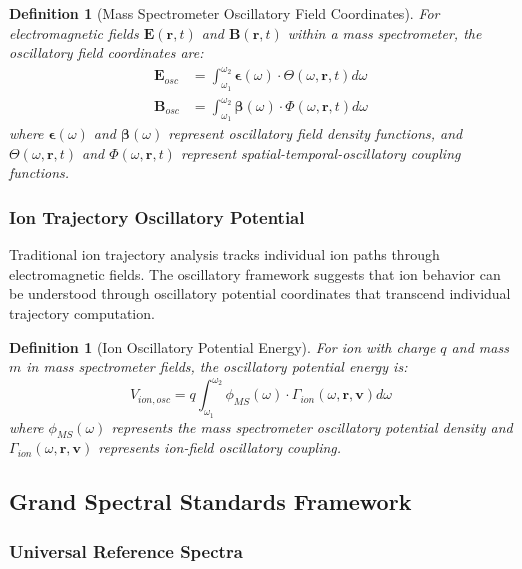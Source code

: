 \documentclass[11pt,a4paper]{article}
\newtheorem{definition}[theorem]{Definition}
\theoremstyle{remark}
\begin{document}
\begin{definition}[Mass Spectrometer Oscillatory Field Coordinates]
For electromagnetic fields $\mathbf{E}(\mathbf{r}, t)$ and $\mathbf{B}(\mathbf{r}, t)$ within a mass spectrometer, the oscillatory field coordinates are:
\begin{align}
\mathbf{E}_{osc} &= \int_{\omega_1}^{\omega_2} \boldsymbol{\epsilon}(\omega) \cdot \Theta(\omega, \mathbf{r}, t) d\omega\\
\mathbf{B}_{osc} &= \int_{\omega_1}^{\omega_2} \boldsymbol{\beta}(\omega) \cdot \Phi(\omega, \mathbf{r}, t) d\omega
\end{align}
where $\boldsymbol{\epsilon}(\omega)$ and $\boldsymbol{\beta}(\omega)$ represent oscillatory field density functions, and $\Theta(\omega, \mathbf{r}, t)$ and $\Phi(\omega, \mathbf{r}, t)$ represent spatial-temporal-oscillatory coupling functions.
\end{definition}

\subsubsection{Ion Trajectory Oscillatory Potential}

Traditional ion trajectory analysis tracks individual ion paths through electromagnetic fields. The oscillatory framework suggests that ion behavior can be understood through oscillatory potential coordinates that transcend individual trajectory computation.

\begin{definition}[Ion Oscillatory Potential Energy]
For ion with charge $q$ and mass $m$ in mass spectrometer fields, the oscillatory potential energy is:
\begin{equation}
V_{ion,osc} = q \int_{\omega_1}^{\omega_2} \phi_{MS}(\omega) \cdot \Gamma_{ion}(\omega, \mathbf{r}, \mathbf{v}) d\omega
\end{equation}
where $\phi_{MS}(\omega)$ represents the mass spectrometer oscillatory potential density and $\Gamma_{ion}(\omega, \mathbf{r}, \mathbf{v})$ represents ion-field oscillatory coupling.
\end{definition}

\subsection{Grand Spectral Standards Framework}

\subsubsection{Universal Reference Spectra}
\end{document}
